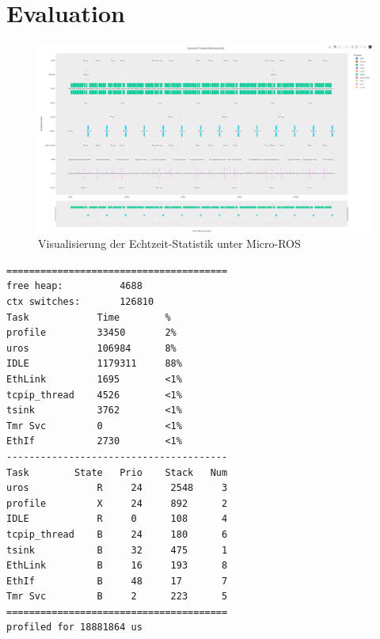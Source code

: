 \section{Evaluation}

\begin{figure}[h]
    \centering
    \includegraphics[width=1\textwidth]{assets/micro_ros_profiling}
    \caption{Visualisierung der Echtzeit-Statistik unter Micro-ROS}
\end{figure}

\begin{code}
\begin{verbatim}
=======================================
free heap:          4688
ctx switches:       126810
Task            Time        %
profile         33450       2%
uros            106984      8%
IDLE            1179311     88%
EthLink         1695        <1%
tcpip_thread    4526        <1%
tsink           3762        <1%
Tmr Svc         0           <1%
EthIf           2730        <1%
---------------------------------------
Task        State   Prio    Stack   Num
uros            R     24     2548     3
profile         X     24     892      2
IDLE            R     0      108      4
tcpip_thread    B     24     180      6
tsink           B     32     475      1
EthLink         B     16     193      8
EthIf           B     48     17       7
Tmr Svc         B     2      223      5
=======================================
profiled for 18881864 us
\end{verbatim}
\end{code}

